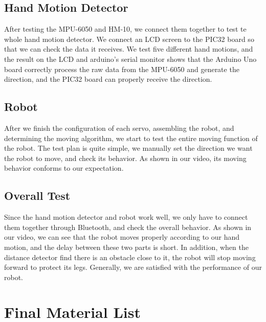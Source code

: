 \documentclass[a4paper]{article}
\begin{document}
\subsection{Hand Motion Detector}
After testing the MPU-6050 and HM-10, we connect them together to test te whole hand motion detector. We connect an LCD screen to the PIC32 board so that we can check the data it receives. We test five different hand motions, and the result on the LCD and arduino's serial monitor shows that the Arduino Uno board correctly process the raw data from the MPU-6050 and generate the direction, and the PIC32 board can properly receive the direction.

\subsection{Robot}
After we finish the configuration of each servo, assembling the robot, and determining the moving algorithm, we start to test the entire moving function of the robot. The test plan is quite simple, 
we manually set the direction we want the robot to move, and check its behavior. As shown in our video, its moving behavior conforms to our expectation.

\subsection{Overall Test}
Since the hand motion detector and robot work well, we only have to connect them together through Bluetooth, and check the overall behavior. As shown in our video, we can see that the robot moves properly according to our hand motion, and the delay between these two parts is short. In addition, when the distance detector find there is an obstacle close to it, the robot will stop moving forward to protect its legs. Generally, we are satisfied with the performance of our robot.

\section{Final Material List}
\end{document}
